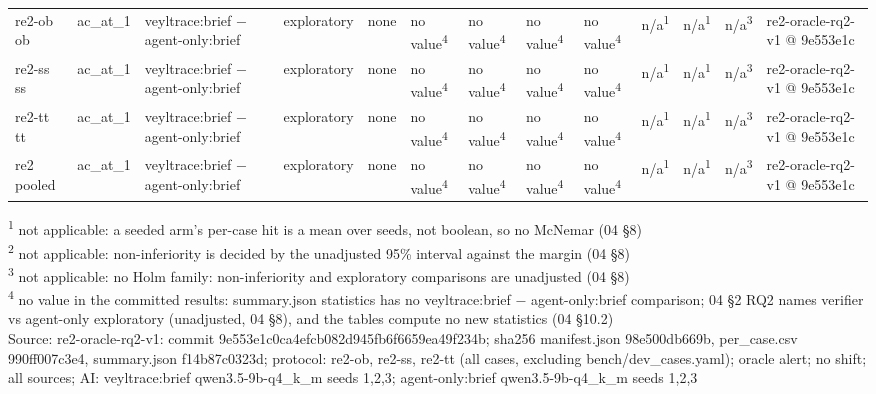 \begin{table}[t]
\begin{tabular}{lllllllllllll}
re2-ob ob & ac\_at\_1 & veyltrace:brief $-$ agent-only:brief & exploratory & none & no value\textsuperscript{4} & no value\textsuperscript{4} & no value\textsuperscript{4} & no value\textsuperscript{4} & n/a\textsuperscript{1} & n/a\textsuperscript{1} & n/a\textsuperscript{3} & re2-oracle-rq2-v1 @ 9e553e1c \\
re2-ss ss & ac\_at\_1 & veyltrace:brief $-$ agent-only:brief & exploratory & none & no value\textsuperscript{4} & no value\textsuperscript{4} & no value\textsuperscript{4} & no value\textsuperscript{4} & n/a\textsuperscript{1} & n/a\textsuperscript{1} & n/a\textsuperscript{3} & re2-oracle-rq2-v1 @ 9e553e1c \\
re2-tt tt & ac\_at\_1 & veyltrace:brief $-$ agent-only:brief & exploratory & none & no value\textsuperscript{4} & no value\textsuperscript{4} & no value\textsuperscript{4} & no value\textsuperscript{4} & n/a\textsuperscript{1} & n/a\textsuperscript{1} & n/a\textsuperscript{3} & re2-oracle-rq2-v1 @ 9e553e1c \\
re2 pooled & ac\_at\_1 & veyltrace:brief $-$ agent-only:brief & exploratory & none & no value\textsuperscript{4} & no value\textsuperscript{4} & no value\textsuperscript{4} & no value\textsuperscript{4} & n/a\textsuperscript{1} & n/a\textsuperscript{1} & n/a\textsuperscript{3} & re2-oracle-rq2-v1 @ 9e553e1c \\
\hline
\end{tabular}
\par\smallskip\footnotesize
\textsuperscript{1} not applicable: a seeded arm's per-case hit is a mean over seeds, not boolean, so no McNemar (04 \S{}8)\\
\textsuperscript{2} not applicable: non-inferiority is decided by the unadjusted 95\% interval against the margin (04 \S{}8)\\
\textsuperscript{3} not applicable: no Holm family: non-inferiority and exploratory comparisons are unadjusted (04 \S{}8)\\
\textsuperscript{4} no value in the committed results: summary.json statistics has no veyltrace:brief $-$ agent-only:brief comparison; 04 \S{}2 RQ2 names verifier vs agent-only exploratory (unadjusted, 04 \S{}8), and the tables compute no new statistics (04 \S{}10.2)\\
Source: re2-oracle-rq2-v1: commit 9e553e1c0ca4efcb082d945fb6f6659ea49f234b; sha256 manifest.json 98e500db669b, per\_case.csv 990ff007c3e4, summary.json f14b87c0323d; protocol: re2-ob, re2-ss, re2-tt (all cases, excluding bench/dev\_cases.yaml); oracle alert; no shift; all sources; AI: veyltrace:brief qwen3.5-9b-q4\_k\_m seeds 1,2,3; agent-only:brief qwen3.5-9b-q4\_k\_m seeds 1,2,3\\
\end{table}
